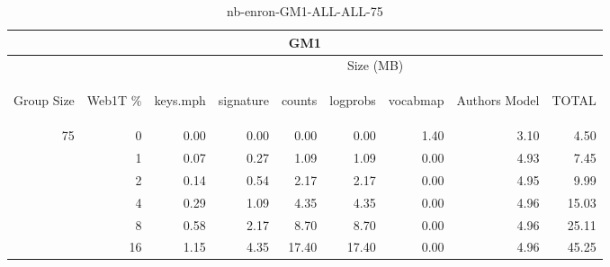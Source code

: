 \begin{center}
\begin{table}[htbp]
\begin{tabular}{ | r | r | r | r | r | r | r | r | r |}
\hline
\multicolumn{9}{|c|}{GM1}\\
\hline
 & & \multicolumn{7}{|c|}{Size (MB)}\\ \cline{3-9}
\begin{sideways}Group Size\end{sideways} & \begin{sideways}Web1T \% \end{sideways} & \begin{sideways}keys.mph\end{sideways} & \begin{sideways}signature\end{sideways} & \begin{sideways}counts\end{sideways} & \begin{sideways}logprobs\end{sideways} & \begin{sideways}vocabmap\end{sideways} & \begin{sideways}Authors Model \end{sideways} & \begin{sideways}TOTAL\end{sideways}\\
\hline
\multirow{5}{*}{75}
 & 0 & 0.00 & 0.00 & 0.00 & 0.00 & 1.40 & 3.10 & 4.50\\ \cline{2-9}
 & 1 & 0.07 & 0.27 & 1.09 & 1.09 & 0.00 & 4.93 & 7.45\\ \cline{2-9}
 & 2 & 0.14 & 0.54 & 2.17 & 2.17 & 0.00 & 4.95 & 9.99\\ \cline{2-9}
 & 4 & 0.29 & 1.09 & 4.35 & 4.35 & 0.00 & 4.96 & 15.03\\ \cline{2-9}
 & 8 & 0.58 & 2.17 & 8.70 & 8.70 & 0.00 & 4.96 & 25.11\\ \cline{2-9}
 & 16 & 1.15 & 4.35 & 17.40 & 17.40 & 0.00 & 4.96 & 45.25\\ \cline{2-9}
\hline
\end{tabular}
\caption{nb-enron-GM1-ALL-ALL-75}
\label{table:nb-enron-GM1-ALL-ALL-75}
\end{table}
\end{center}

